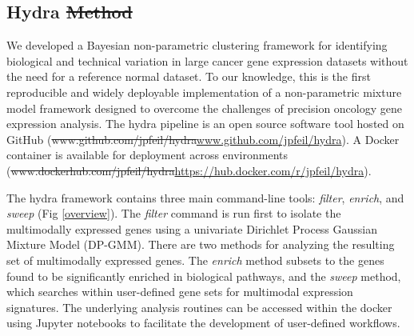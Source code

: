 \documentclass[10pt,letterpaper]{article}
\providecommand{\DIFaddtex}[1]{{\protect\color{blue}\uwave{#1}}} %
\providecommand{\DIFdeltex}[1]{{\protect\color{red}\sout{#1}}}                      %
\providecommand{\DIFaddbegin}{} %
\providecommand{\DIFaddend}{} %
\providecommand{\DIFdelbegin}{} %
\providecommand{\DIFdelend}{} %
\providecommand{\DIFadd}[1]{\texorpdfstring{\DIFaddtex{#1}}{#1}} %
\providecommand{\DIFdel}[1]{\texorpdfstring{\DIFdeltex{#1}}{}} %
\newcommand{\DIFscaledelfig}{0.5}
\newlength{\DIFdelgraphicswidth} %
\newlength{\DIFdelgraphicsheight} %
\newcommand{\DIFaddincludegraphics}[2][]{{\color{blue}\fbox{\DIFOincludegraphics[#1]{#2}}}} %
\newcommand{\DIFdelincludegraphics}[2][]{%
\sbox{\DIFdelgraphicsbox}{\DIFOincludegraphics[#1]{#2}}%
\settoboxwidth{\DIFdelgraphicswidth}{\DIFdelgraphicsbox} %
\settoboxtotalheight{\DIFdelgraphicsheight}{\DIFdelgraphicsbox} %
\scalebox{\DIFscaledelfig}{%
\parbox[b]{\DIFdelgraphicswidth}{\usebox{\DIFdelgraphicsbox}\\[-\baselineskip] \rule{\DIFdelgraphicswidth}{0em}}\llap{\resizebox{\DIFdelgraphicswidth}{\DIFdelgraphicsheight}{%
\setlength{\unitlength}{\DIFdelgraphicswidth}%
\begin{picture}(1,1)%
\thicklines\linethickness{2pt} %
{\color[rgb]{1,0,0}\put(0,0){\framebox(1,1){}}}%
{\color[rgb]{1,0,0}\put(0,0){\line( 1,1){1}}}%
{\color[rgb]{1,0,0}\put(0,1){\line(1,-1){1}}}%
\end{picture}%
}\hspace*{3pt}}} %
} %
\DeclareRobustCommand{\DIFaddbegin}{\DIFOaddbegin \let\includegraphics\DIFaddincludegraphics} %
\DeclareRobustCommand{\DIFaddend}{\DIFOaddend \let\includegraphics\DIFOincludegraphics} %
\DeclareRobustCommand{\DIFdelbegin}{\DIFOdelbegin \let\includegraphics\DIFdelincludegraphics} %
\DeclareRobustCommand{\DIFdelend}{\DIFOaddend \let\includegraphics\DIFOincludegraphics} %
\begin{document}
\subsection*{Hydra \DIFdelbegin \DIFdel{Method}\DIFdelend \DIFaddbegin \DIFadd{method}\DIFaddend }
We developed a Bayesian non-parametric clustering framework for identifying biological and technical variation in large cancer gene expression datasets without the need for a reference normal dataset. To our knowledge, this is the first reproducible and widely deployable implementation of a non-parametric mixture model framework designed to overcome the challenges of precision oncology gene expression analysis. The hydra pipeline is an open source software tool hosted on GitHub (\DIFdelbegin \DIFdel{www.github.com/jpfeil/hydra}\DIFdelend \DIFaddbegin \url{www.github.com/jpfeil/hydra}\DIFaddend ). A Docker container is available for deployment across environments (\DIFdelbegin \DIFdel{www.dockerhub.com/jpfeil/hydra}\DIFdelend \DIFaddbegin \url{https://hub.docker.com/r/jpfeil/hydra}\DIFaddend ).

The hydra framework contains three main command-line tools: \textit{filter}, \textit{enrich}, and \textit{sweep} (Fig \ref{overview}). The \textit{filter} command is run first to isolate the multimodally expressed genes using a univariate Dirichlet Process Gaussian Mixture Model (DP-GMM). There are two methods for analyzing the resulting set of multimodally expressed genes. The \textit{enrich} method subsets to the genes found to be significantly enriched in biological pathways, and the \textit{sweep} method, which searches within user-defined gene sets for multimodal expression signatures. The underlying analysis routines can be accessed within the docker using Jupyter notebooks to facilitate the development of user-defined workflows.
\end{document}
